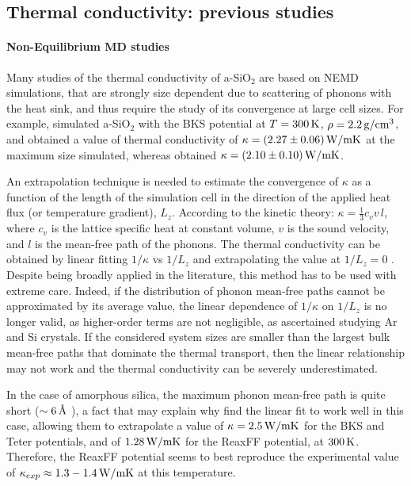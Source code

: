 \subsection{Thermal conductivity: previous studies}  \label{sec:silica-kappa-studies}
\paragraph{Non-Equilibrium MD studies}
Many studies of the thermal conductivity of a-SiO$_2$ are based on NEMD simulations, that are strongly size dependent due to scattering of phonons with the heat sink, and thus require the study of its convergence at large cell sizes. 
For example, \citet{Tian2017} simulated a-SiO$_2$ with the BKS potential at $T=300\,\mathrm{K}$, $\rho=2.2\,\mathrm{g/cm^3}$, and obtained a value of thermal conductivity of $\kappa=(2.27 \pm 0.06)\,\mathrm{W/mK}$ at the maximum size simulated, whereas \citet{Coquil2011} obtained $\kappa= (2.10 \pm 0.10)\,\mathrm{W/mK}$. 

An extrapolation technique is needed to estimate the convergence of $\kappa$ as a function of the length of the simulation cell in the direction of the applied heat flux (or temperature gradient), $L_z$. According to the kinetic theory: $\kappa = \frac{1}{3} c_v v \,l$, where $c_v$ is the lattice specific heat at constant volume, $v$ is the sound velocity, and $l$ is the mean-free path of the phonons. The thermal conductivity can be obtained by linear fitting $1/\kappa$ vs $1/L_z$ and extrapolating the value at $1/L_z=0$ \cite{Schelling2002}. 
Despite being broadly applied in the literature, this method has to be used with extreme care. Indeed, if the distribution of phonon mean-free paths cannot be approximated by its average value, the linear dependence of $1/\kappa$ on $1/L_z$ is no longer valid, as higher-order terms are not negligible, as \citet{Sellan2010} ascertained studying Ar and Si crystals. If the considered system sizes are smaller than the largest bulk mean-free paths that dominate the thermal transport, then the linear relationship may not work and the thermal conductivity can be severely underestimated.

In the case of amorphous silica, the maximum phonon mean-free path is quite short ($\sim 6\,\mathrm{{\mbox{\AA}}}$ \cite{Yu2006}), a fact that may explain why \citet{Tian2017} find the linear fit to work well in this case, allowing them to extrapolate a value of $\kappa=2.5\,\mathrm{W/mK}$ for the BKS and Teter potentials, and of $1.28\,\mathrm{W/mK}$ for the ReaxFF potential, at $300\,\mathrm{K}$. Therefore, the ReaxFF potential seems to best reproduce the experimental value of $\kappa_{exp}\approx 1.3-1.4\,\mathrm{W/mK}$ at this temperature. 


